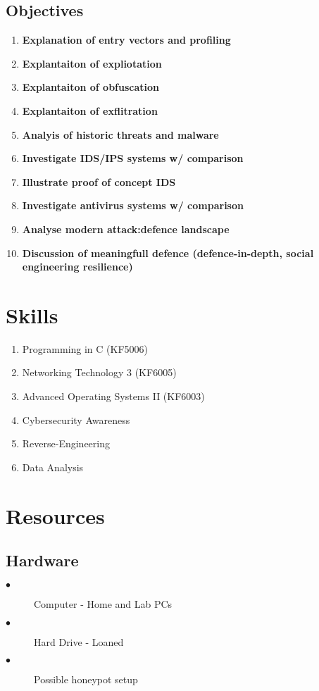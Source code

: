 \subsection{Objectives}
\begin{enumerate}
	\item \textbf{Explanation of entry vectors and profiling}
	\item \textbf{Explantaiton of expliotation}
	\item \textbf{Explantaiton of obfuscation}
	\item \textbf{Explantaiton of exflitration}
	\item \textbf{Analyis of historic threats and malware}
	\item \textbf{Investigate IDS/IPS systems w/ comparison}
	\item \textbf{Illustrate proof of concept IDS}
	\item \textbf{Investigate antivirus systems w/ comparison}
	\item \textbf{Analyse modern attack:defence landscape}
	\item \textbf{Discussion of meaningfull defence (defence-in-depth, social engineering resilience)}
\end{enumerate}

\section{Skills}
\begin{enumerate}
	\item Programming in C (KF5006)
	\item Networking Technology 3 (KF6005)
	\item Advanced Operating Systems II (KF6003)
	\item Cybersecurity Awareness
	\item Reverse-Engineering
	\item Data Analysis
\end{enumerate}

\section{Resources}
\subsection{Hardware}
\begin{description}
	\item[$\bullet$] Computer - Home and Lab PCs
	\item[$\bullet$] Hard Drive - Loaned
	\item[$\bullet$] Possible honeypot setup
\end{description}

